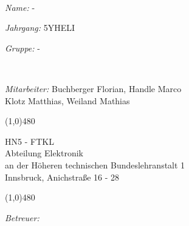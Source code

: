 \documentclass[12pt, a4paper]{article}
\begin{document}
\def \Titel 			{Monitorsteuerung}
\def \Name				{-}
\def \NameMitarbeiter	{Buchberger Florian, Handle Marco\\\hspace{2.6cm} Klotz Matthias, Weiland Mathias}
\def \Betreuer			{Stecher}
\def \Ausgefuehrt		{01. 01. 14}
\def \Abgegeben			{02. 01. 14}
\def \Jahrgang			{5YHELI}
\def \Gruppe			{-}



\begin{titlepage}
~\\[0.5cm]
\begin{minipage}{0.4\textwidth}
\begin{flushleft} \large

\emph{Name:} \Name
\end{flushleft}
\end{minipage}
\begin{minipage}{0.3\textwidth}
\begin{center}\large
\emph{Jahrgang:} \Jahrgang
\end{center}
\end{minipage}
\hspace{0.5cm}
\begin{minipage}{0.2\textwidth}
\begin{flushright} \large
\emph{Gruppe:} \Gruppe
\end{flushright}
\end{minipage}
~\\[0.6cm]
\begin{minipage}{0.8\textwidth}
\begin{flushleft} \large
\emph{Mitarbeiter:} \NameMitarbeiter
\end{flushleft}
\end{minipage}
\begin{center}
\line(1,0){480}
\end{center}
\begin{center}
\textsc{\LARGE HN5 - FTKL}\\
\large Abteilung Elektronik\\[1cm]
an der H\"oheren technischen Bundeslehranstalt 1\\
Innsbruck, Anichstraße 16 - 28
\end{center}
\begin{center}
\line(1,0){480}
\end{center}
\begin{minipage}{0.2\textwidth}
\begin{flushleft} \large
\emph{Betreuer:}\\

\end{flushleft}
\end{minipage}
\end{titlepage}
\end{document}
